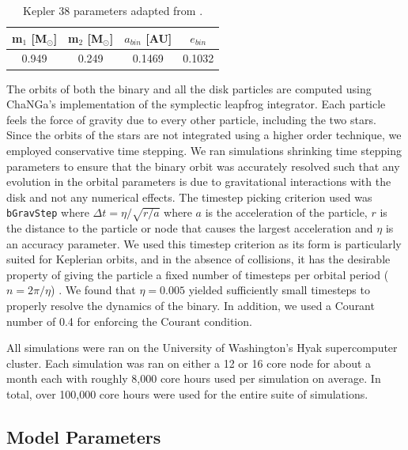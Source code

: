 \begin{table}
	\centering
	\caption{Kepler 38 parameters adapted from \citet{Orosz2012}.}
	\begin{tabular}{cccc} %
		\hline
		m$_1$ [M$_{\odot}$] & m$_2$ [M$_{\odot}$] & $a_{bin}$ [AU] & $e_{bin}$\\
		\hline
		0.949 & 0.249 & 0.1469 & 0.1032\\
		\hline
	\end{tabular}
	\label{tab:CBDisk_table_1}
\end{table}

The orbits of both the binary and all the disk particles are computed using ChaNGa's implementation of the 
symplectic leapfrog integrator.  Each particle feels the force of gravity due to every other particle, including
the two stars.  Since the orbits of the stars are not integrated using a higher order technique, we employed conservative
time stepping.  We ran simulations shrinking time stepping parameters to 
ensure that the binary orbit was accurately resolved such that any evolution in the orbital parameters is due to 
gravitational interactions with the disk and not any numerical
effects.  The timestep picking criterion used was {\tt bGravStep} where  
$\Delta t = \eta/\sqrt{r/a}$ where $a$ is the acceleration of the
particle, $r$ is the distance to the particle or node that causes the largest
acceleration and $\eta$ is an accuracy parameter.  We used this timestep criterion as its form is particularly suited for Keplerian orbits, and in the absence of collisions, it has the desirable property of giving the particle a fixed number of timesteps per orbital period ($n = 2\pi/ \eta$) \citep{Richardson2000}.  We found that 
$\eta = 0.005$ yielded sufficiently small timesteps to properly
resolve the dynamics of the binary.  In addition, we used a Courant number of
0.4 for enforcing the Courant condition.

All simulations were ran on the University of Washington's Hyak supercomputer cluster.  Each simulation was ran on either a 12 or 16 core node for about a month each with roughly 8,000 core hours used per simulation on average.  In total, over 100,000 core hours were used for the entire suite of simulations.

\subsection{Model Parameters}

